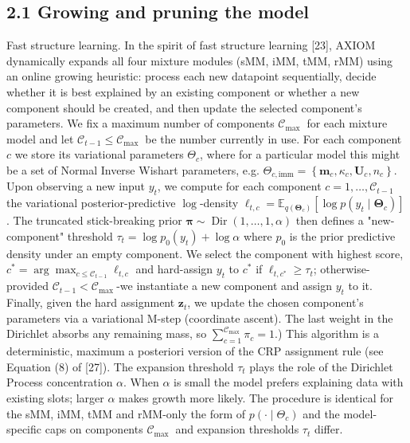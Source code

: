 \documentclass[10pt]{article}
\begin{document}
\subsection*{2.1 Growing and pruning the model}
Fast structure learning. In the spirit of fast structure learning [23], AXIOM dynamically expands all four mixture modules (sMM, iMM, tMM, rMM) using an online growing heuristic: process each new datapoint sequentially, decide whether it is best explained by an existing component or whether a new component should be created, and then update the selected component's parameters. We fix a maximum number of components $\mathcal{C}_{\text {max }}$ for each mixture model and let $\mathcal{C}_{t-1} \leq \mathcal{C}_{\text {max }}$ be the number currently in use. For each component $c$ we store its variational parameters $\Theta_{c}$, where for a particular model this might be a set of Normal Inverse Wishart parameters, e.g. $\Theta_{c, \mathrm{imm}}=\left\{\mathbf{m}_{c}, \kappa_{c}, \mathbf{U}_{c}, n_{c}\right\}$.\\
Upon observing a new input $y_{t}$, we compute for each component $c=1, \ldots, \mathcal{C}_{t-1}$ the variational posterior-predictive $\log$-density $\ell_{t, c}=\mathbb{E}_{q\left(\boldsymbol{\Theta}_{c}\right)}\left[\log p\left(y_{t} \mid \boldsymbol{\Theta}_{c}\right)\right]$. The truncated stick-breaking prior $\boldsymbol{\pi} \sim \operatorname{Dir}(1, \ldots, 1, \alpha)$ then defines a "new-component" threshold $\tau_{t}=\log p_{0}\left(y_{t}\right)+\log \alpha$ where $p_{0}$ is the prior predictive density under an empty component. We select the component with highest score, $c^{*}=\arg \max _{c \leq \mathcal{C}_{t-1}} \ell_{t, c}$ and hard-assign $y_{t}$ to $c^{*}$ if $\ell_{t, c^{*}} \geq \tau_{t}$; otherwise-provided $\mathcal{C}_{t-1}<\mathcal{C}_{\text {max }}$-we instantiate a new component and assign $y_{t}$ to it. Finally, given the hard assignment $\boldsymbol{z}_{t}$, we update the chosen component's parameters via a variational M-step (coordinate ascent). The last weight in the Dirichlet absorbs any remaining mass, so $\sum_{c=1}^{\mathcal{C}_{\text {max }}} \pi_{c}=1$.) This algorithm is a deterministic, maximum a posteriori version of the CRP assignment rule (see Equation (8) of [27]). The expansion threshold $\tau_{t}$ plays the role of the Dirichlet Process concentration $\alpha$. When $\alpha$ is small the model prefers explaining data with existing slots; larger $\alpha$ makes growth more likely. The procedure is identical for the sMM, iMM, tMM and rMM-only the form of $p\left(\cdot \mid \Theta_{c}\right)$ and the model-specific caps on components $\mathcal{C}_{\text {max }}$ and expansion thresholds $\tau_{t}$ differ.
\end{document}
